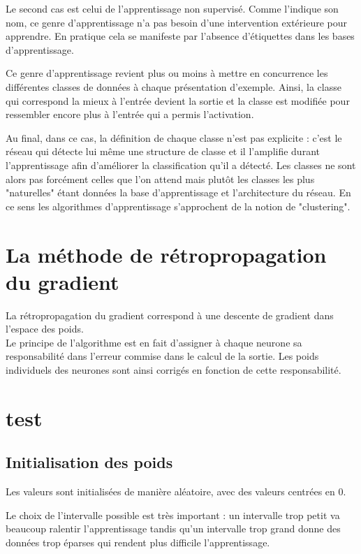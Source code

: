 \documentclass[a4paper,oneside]{report}
\begin{document}
                Le second cas est celui de l'apprentissage non supervisé. Comme l'indique son nom, ce genre d'apprentissage n'a pas besoin d'une intervention extérieure pour apprendre. En pratique cela se manifeste par l'absence d'étiquettes dans les bases d'apprentissage.

                Ce genre d'apprentissage revient plus ou moins à mettre en concurrence les différentes classes de données à chaque présentation d'exemple. Ainsi, la classe qui correspond la mieux à l'entrée devient la sortie et la classe est modifiée pour ressembler encore plus à l'entrée qui a permis l'activation.

                Au final, dans ce cas, la définition de chaque classe n'est pas explicite : c'est le réseau qui détecte lui même une structure de classe et il l'amplifie durant l'apprentissage afin d'améliorer la classification qu'il a détecté. Les classes ne sont alors pas forcément celles que l'on attend mais plutôt les classes les plus "naturelles" étant données la base d'apprentissage et l'architecture du réseau. En ce sens les algorithmes d'apprentissage s'approchent de la notion de "clustering".


            \section{La méthode de rétropropagation du gradient}

                La rétropropagation du gradient correspond à une descente de gradient dans l'espace des poids.\\

                Le principe de l'algorithme est en fait d'assigner à chaque neurone sa responsabilité dans l'erreur commise dans le calcul de la sortie. Les poids individuels des neurones sont ainsi corrigés en fonction de cette responsabilité.
                \section{test}


                \subsection{Initialisation des poids}

                    Les valeurs sont initialisées de manière aléatoire, avec des valeurs centrées en 0.

                    Le choix de l'intervalle possible est très important : un intervalle trop petit va beaucoup ralentir l'apprentissage tandis qu'un intervalle trop grand donne des données trop éparses qui rendent plus difficile l'apprentissage.
\end{document}
